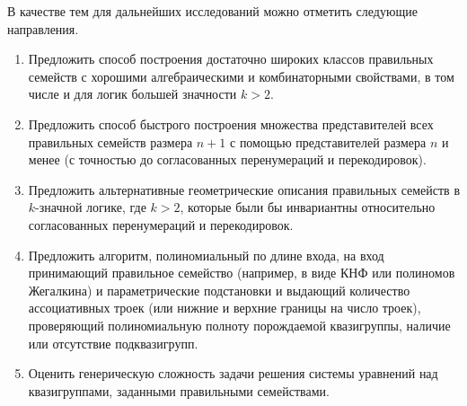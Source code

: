 В качестве тем для дальнейших исследований можно отметить следующие направления.

\begin{enumerate}
    \item Предложить способ построения достаточно широких классов правильных семейств с хорошими алгебраическими и комбинаторными свойствами, в том числе и для логик большей значности $k > 2$.

    \item Предложить способ быстрого построения множества представителей всех правильных семейств размера $n+1$ с помощью представителей размера $n$ и менее (с точностью до согласованных перенумераций и перекодировок).

    \item Предложить альтернативные геометрические описания правильных семейств в $k$-значной логике, где $k>2$, которые были бы инвариантны относительно согласованных перенумераций и перекодировок.

    \item Предложить алгоритм, полиномиальный по длине входа, на вход принимающий правильное семейство (например, в виде КНФ или полиномов Жегалкина) и параметрические подстановки и выдающий количество ассоциативных троек (или нижние и верхние границы на число троек), проверяющий полиномиальную полноту порождаемой квазигруппы, наличие или отсутствие подквазигрупп.

    \item Оценить генерическую сложность задачи решения системы уравнений над квазигруппами, заданными правильными семействами.
\end{enumerate}
